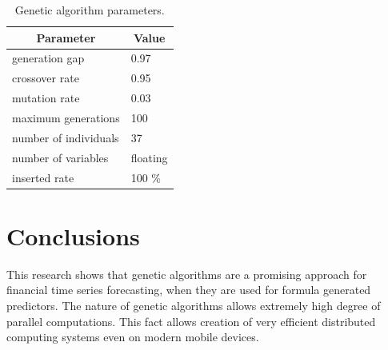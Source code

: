 \documentclass[graybox]{svmult}
\begin{document}
\begin{table}[]
\centering
\begin{tabular}{@{}ll@{}}
\hline
\multicolumn{1}{|c|}{{ \textbf{Parameter}}} & \multicolumn{1}{|c|}{{\textbf{Value}}} \\
\hline
\multicolumn{1}{|l|}{generation gap}                                                  & \multicolumn{1}{l|}{0.97}                                                         \\
\multicolumn{1}{|l|}{crossover rate}                                                  & \multicolumn{1}{l|}{0.95}                                                         \\
\multicolumn{1}{|l|}{mutation rate}                                                   & \multicolumn{1}{l|}{0.03}                                                         \\
\multicolumn{1}{|l|}{maximum generations}                                             & \multicolumn{1}{l|}{100}                                                         \\
\multicolumn{1}{|l|}{number of individuals}                                           & \multicolumn{1}{l|}{37}                                                           \\
\multicolumn{1}{|l|}{number of variables}                                             & \multicolumn{1}{l|}{floating}                                                     \\
\multicolumn{1}{|l|}{inserted rate}                                                                       & \multicolumn{1}{l|}{100 \%}                                                                            \\
\hline
\end{tabular}
\caption{Genetic algorithm parameters.}
\label{tab01}
\end{table}

\section{Conclusions} \label{Conclusions}

This research shows that genetic algorithms are a promising approach for financial time series forecasting, when they are used for formula generated predictors. The nature of genetic algorithms allows extremely high degree of parallel computations. This fact allows creation of very efficient distributed computing systems even on modern mobile devices. 
\end{document}
